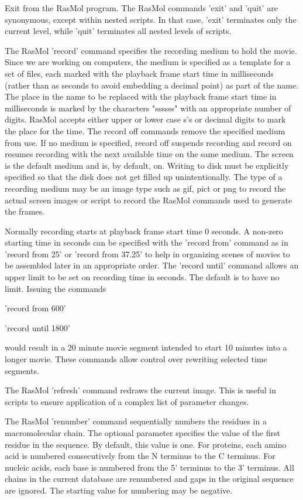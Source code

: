 Exit from the RasMol program. The RasMol commands
'exit'
and
'quit'
are synonymous, except within nested scripts.  In that case,
'exit'
terminates only the current level, while
'quit'
terminates all nested levels of scripts.

The RasMol
'record'
command specifies the recording medium to hold the movie. Since we are
working on computers, the medium is specified as a template for a set of
files, each marked with the playback frame start time in milliseconds
(rather than as seconds to avoid embedding a decimal point) as part of
the name. The place in the name to be replaced with the playback frame
start time in milliseconds is marked by the characters "ssssss" with
an appropriate number of digits. RasMol accepts either upper or lower case
s's or decimal digits to mark the place for the time.  The record off
commands remove the specified medium from use. If no medium is specified,
record off suspends recording and record on resumes recording with the
next available time on the same medium. The screen is the default medium
and is, by default, on. Writing to disk must be explicitly specified so
that the disk does not get filled up unintentionally. The type of a
recording medium may be an image type such as gif, pict or png to record
the actual screen images or script to record the RasMol commands used to
generate the frames.

Normally recording starts at playback frame start time 0 seconds.
A non-zero starting time in seconds can be specified with the
'record from'
command as in
'record from 25'
or
'record from 37.25'
to help in organizing scenes of movies to be assembled later in an
appropriate order.
The
'record until'
command allows an upper limit to be set on recording time in seconds.
The default is to have no limit. Issuing the commands

'record from 600'

'record until 1800'

would result in a 20 minute movie segment intended to start 10
minutes into a longer movie.
These commands allow control over rewriting selected time segments.

The RasMol
'refresh'
command redraws the current image.  This is useful in scripts
to ensure application of a complex list of parameter changes.

The RasMol
'renumber'
command sequentially numbers the residues in a macromolecular chain.
The optional parameter specifies the value of the first residue in the
sequence. By default, this value is one. For proteins,
each amino acid is numbered consecutively from the N terminus to the C
terminus. For nucleic acids, each base is numbered from the 5' terminus
to the 3' terminus. All chains in the current database are renumbered and gaps
in the original sequence are ignored. The starting value for numbering may
be negative.

